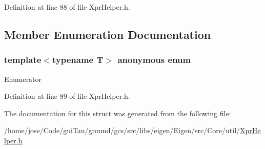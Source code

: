 Definition at line 88 of file Xpr\-Helper.\-h.



\subsection{Member Enumeration Documentation}
\hypertarget{structei__unpacket__traits_af9a699b139da700d28fccc35788b2a52}{\subsubsection[{anonymous enum}]{\setlength{\rightskip}{0pt plus 5cm}template$<$typename T$>$ anonymous enum}}\label{structei__unpacket__traits_af9a699b139da700d28fccc35788b2a52}
\begin{Desc}
\item[Enumerator]\par
\begin{description}
\item[{\em 
\hypertarget{structei__unpacket__traits_af9a699b139da700d28fccc35788b2a52a2f50f1bedf68a8ff094dd3bb898bb2f7}{size}\label{structei__unpacket__traits_af9a699b139da700d28fccc35788b2a52a2f50f1bedf68a8ff094dd3bb898bb2f7}
}]\end{description}
\end{Desc}


Definition at line 89 of file Xpr\-Helper.\-h.



The documentation for this struct was generated from the following file\-:\begin{DoxyCompactItemize}
\item 
/home/jose/\-Code/gui\-Tau/ground/gcs/src/libs/eigen/\-Eigen/src/\-Core/util/\hyperlink{_xpr_helper_8h}{Xpr\-Helper.\-h}\end{DoxyCompactItemize}
